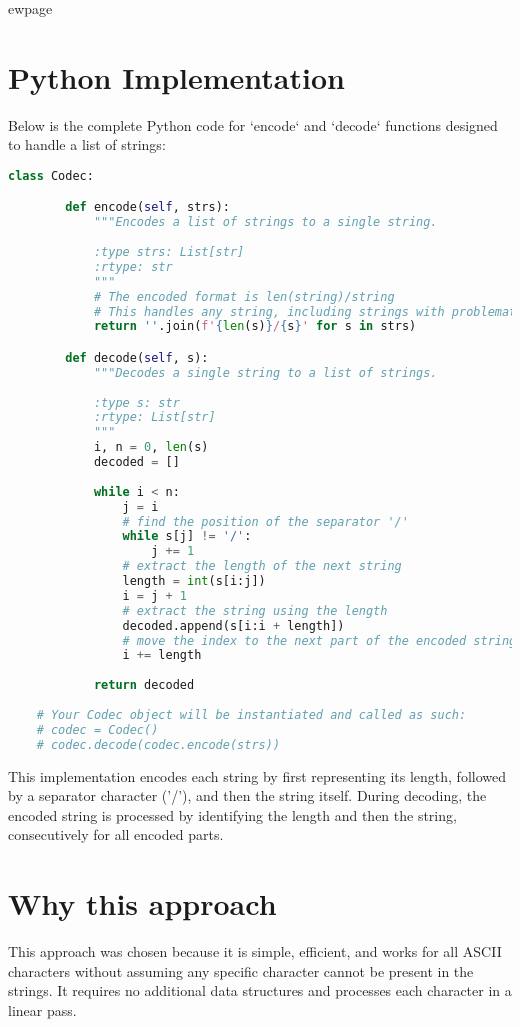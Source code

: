 ewpage %
\section*{Python Implementation}
Below is the complete Python code for `encode` and `decode` functions designed to handle a list of strings:

\begin{fullwidth}
\begin{lstlisting}[language=Python]
	class Codec:

	    def encode(self, strs):
	        """Encodes a list of strings to a single string.
	        
	        :type strs: List[str]
	        :rtype: str
	        """
	        # The encoded format is len(string)/string
	        # This handles any string, including strings with problematic characters
	        return ''.join(f'{len(s)}/{s}' for s in strs)

	    def decode(self, s):
	        """Decodes a single string to a list of strings.
	        
	        :type s: str
	        :rtype: List[str]
	        """
	        i, n = 0, len(s)
	        decoded = []
	        
	        while i < n:
	            j = i
	            # find the position of the separator '/'
	            while s[j] != '/':
	                j += 1
	            # extract the length of the next string
	            length = int(s[i:j])
	            i = j + 1
	            # extract the string using the length
	            decoded.append(s[i:i + length])
	            # move the index to the next part of the encoded string
	            i += length
	            
	        return decoded
	        
	# Your Codec object will be instantiated and called as such:
	# codec = Codec()
	# codec.decode(codec.encode(strs))
\end{lstlisting}

\end{fullwidth}

This implementation encodes each string by first representing its length, followed by a separator character ('/'), and then the string itself. During decoding, the encoded string is processed by identifying the length and then the string, consecutively for all encoded parts.

\section*{Why this approach}
This approach was chosen because it is simple, efficient, and works for all ASCII characters without assuming any specific character cannot be present in the strings. It requires no additional data structures and processes each character in a linear pass.

